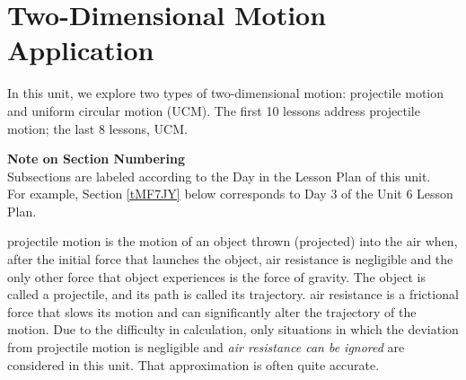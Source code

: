 \documentclass[main-physics.tex]{subfiles}
\begin{document}
\setcounter{section}{5} %
\section{Two-Dimensional Motion Application}

In this unit, we explore two types of two-dimensional motion: projectile motion and uniform circular motion (UCM). The first 10 lessons address projectile motion; the last 8 lessons, UCM.

\begin{mdframed}[backgroundcolor=cpBlue]
{\color{white}
\textbf{Note on Section Numbering}\\
Subsections are labeled according to the Day in the Lesson Plan of this unit.\\ For example, Section \hypersetup{linkcolor=.}\ref{tMF7JY} below corresponds to Day 3 of the Unit 6 Lesson Plan.
}
\end{mdframed}

\vspace{1ex}

\cyanhrule

\vspace{1em}

\Gls{projectile motion} is the motion of an object thrown (projected) into the air when, after the initial force that launches the object, air resistance is negligible and the only other force that object experiences is the force of gravity. The object is called a \gls{projectile}, and its path is called its \gls{trajectory}. \Gls{air resistance} is a frictional force that slows its motion and can significantly alter the trajectory of the motion. Due to the difficulty in calculation, only situations in which the deviation from projectile motion is negligible and \textit{air resistance can be ignored} are considered in this unit. That approximation is often quite accurate.

\vspace{1em}
\end{document}

